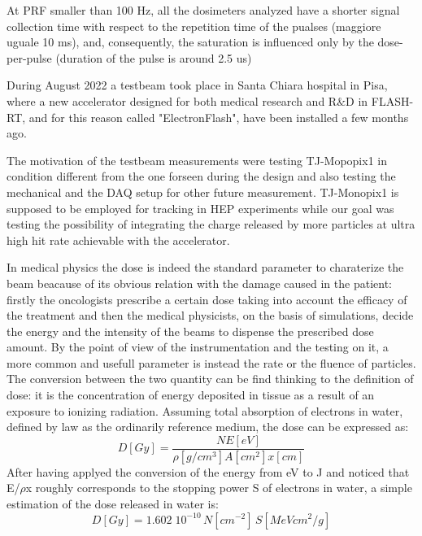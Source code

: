 At PRF smaller than 100 Hz, all the dosimeters analyzed have
a shorter signal collection time with respect to the repetition
time of the pualses (maggiore uguale 10 ms), and, consequently, the saturation
is influenced only by the dose-per-pulse (duration of the pulse is
around 2.5 us)


During August 2022 a testbeam took place in Santa Chiara hospital in Pisa, where a new accelerator designed for both medical research and R$\&$D in FLASH-RT, and for this reason called "ElectronFlash", have been installed a few months ago. 

The motivation of the testbeam measurements were testing TJ-Mopopix1 in condition different from the one forseen during the design and also testing the mechanical and the DAQ setup for other future measurement. TJ-Monopix1 is supposed to be employed for tracking in HEP experiments while our goal was testing the possibility of integrating the charge released by more particles at ultra high hit rate achievable with the accelerator.

In medical physics the dose is indeed the standard parameter to charaterize the beam beacause of its obvious relation with the damage caused in the patient: firstly the oncologists prescribe a certain dose taking into account the efficacy of the treatment and then the medical physicists, on the basis of simulations, decide the energy and the intensity of the beams to dispense the prescribed dose amount.
By the point of view of the instrumentation and the testing on it, a more common and usefull parameter is instead the rate or the fluence of particles.  
The conversion between the two quantity can be find thinking to the definition of dose: it is the concentration of energy deposited in tissue as a result of an exposure to ionizing radiation. 
Assuming total absorption of electrons in water, defined by law as the ordinarily reference medium, the dose can be expressed as: 
\begin{equation}
   D[Gy] = \frac{N E[eV]}{\rho[g/cm^3] A[cm^2] x[cm]}
\end{equation}
After having applyed the conversion of the energy from \si{eV} to \si{J} and noticed that E/$\rho$x roughly corresponds to the stopping power S of electrons in water, a simple estimation of the dose released in water is:
\begin{equation}
   D[Gy] = 1.602\;10^{-10}\,N[cm^{-2}]\,S[MeV cm^2/g]
\end{equation}


